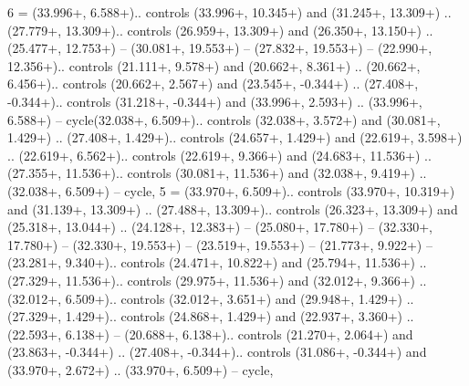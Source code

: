 {6} = {(33.996+\ctpXshift, 6.588+\ctpYshift).. controls (33.996+\ctpXshift, 10.345+\ctpYshift) and (31.245+\ctpXshift, 13.309+\ctpYshift) .. (27.779+\ctpXshift, 13.309+\ctpYshift).. controls (26.959+\ctpXshift, 13.309+\ctpYshift) and (26.350+\ctpXshift, 13.150+\ctpYshift) .. (25.477+\ctpXshift, 12.753+\ctpYshift) -- (30.081+\ctpXshift, 19.553+\ctpYshift) -- (27.832+\ctpXshift, 19.553+\ctpYshift) -- (22.990+\ctpXshift, 12.356+\ctpYshift).. controls (21.111+\ctpXshift, 9.578+\ctpYshift) and (20.662+\ctpXshift, 8.361+\ctpYshift) .. (20.662+\ctpXshift, 6.456+\ctpYshift).. controls (20.662+\ctpXshift, 2.567+\ctpYshift) and (23.545+\ctpXshift, -0.344+\ctpYshift) .. (27.408+\ctpXshift, -0.344+\ctpYshift).. controls (31.218+\ctpXshift, -0.344+\ctpYshift) and (33.996+\ctpXshift, 2.593+\ctpYshift) .. (33.996+\ctpXshift, 6.588+\ctpYshift) -- cycle(32.038+\ctpXshift, 6.509+\ctpYshift).. controls (32.038+\ctpXshift, 3.572+\ctpYshift) and (30.081+\ctpXshift, 1.429+\ctpYshift) .. (27.408+\ctpXshift, 1.429+\ctpYshift).. controls (24.657+\ctpXshift, 1.429+\ctpYshift) and (22.619+\ctpXshift, 3.598+\ctpYshift) .. (22.619+\ctpXshift, 6.562+\ctpYshift).. controls (22.619+\ctpXshift, 9.366+\ctpYshift) and (24.683+\ctpXshift, 11.536+\ctpYshift) .. (27.355+\ctpXshift, 11.536+\ctpYshift).. controls (30.081+\ctpXshift, 11.536+\ctpYshift) and (32.038+\ctpXshift, 9.419+\ctpYshift) .. (32.038+\ctpXshift, 6.509+\ctpYshift) -- cycle},
{5} = {(33.970+\ctpXshift, 6.509+\ctpYshift).. controls (33.970+\ctpXshift, 10.319+\ctpYshift) and (31.139+\ctpXshift, 13.309+\ctpYshift) .. (27.488+\ctpXshift, 13.309+\ctpYshift).. controls (26.323+\ctpXshift, 13.309+\ctpYshift) and (25.318+\ctpXshift, 13.044+\ctpYshift) .. (24.128+\ctpXshift, 12.383+\ctpYshift) -- (25.080+\ctpXshift, 17.780+\ctpYshift) -- (32.330+\ctpXshift, 17.780+\ctpYshift) -- (32.330+\ctpXshift, 19.553+\ctpYshift) -- (23.519+\ctpXshift, 19.553+\ctpYshift) -- (21.773+\ctpXshift, 9.922+\ctpYshift) -- (23.281+\ctpXshift, 9.340+\ctpYshift).. controls (24.471+\ctpXshift, 10.822+\ctpYshift) and (25.794+\ctpXshift, 11.536+\ctpYshift) .. (27.329+\ctpXshift, 11.536+\ctpYshift).. controls (29.975+\ctpXshift, 11.536+\ctpYshift) and (32.012+\ctpXshift, 9.366+\ctpYshift) .. (32.012+\ctpXshift, 6.509+\ctpYshift).. controls (32.012+\ctpXshift, 3.651+\ctpYshift) and (29.948+\ctpXshift, 1.429+\ctpYshift) .. (27.329+\ctpXshift, 1.429+\ctpYshift).. controls (24.868+\ctpXshift, 1.429+\ctpYshift) and (22.937+\ctpXshift, 3.360+\ctpYshift) .. (22.593+\ctpXshift, 6.138+\ctpYshift) -- (20.688+\ctpXshift, 6.138+\ctpYshift).. controls (21.270+\ctpXshift, 2.064+\ctpYshift) and (23.863+\ctpXshift, -0.344+\ctpYshift) .. (27.408+\ctpXshift, -0.344+\ctpYshift).. controls (31.086+\ctpXshift, -0.344+\ctpYshift) and (33.970+\ctpXshift, 2.672+\ctpYshift) .. (33.970+\ctpXshift, 6.509+\ctpYshift) -- cycle},
